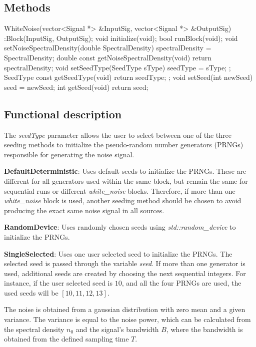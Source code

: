 \subsection*{Methods}

WhiteNoise(vector<Signal *> \&InputSig, vector<Signal *> \&OutputSig) :Block(InputSig, OutputSig){};
\bigbreak	
void initialize(void);
\bigbreak
bool runBlock(void);
\bigbreak
void setNoiseSpectralDensity(double SpectralDensity) { spectralDensity = SpectralDensity; }
\bigbreak
double const getNoiseSpectralDensity(void){ return spectralDensity; }
\bigbreak
void setSeedType(SeedType sType){ seedType = sType; };
\bigbreak
SeedType const getSeedType(void){ return seedType; };
\bigbreak
void setSeed(int newSeed) { seed = newSeed; }
\bigbreak
int getSeed(void){ return seed; }

\subsection*{Functional description}

The \textit{seedType} parameter allows the user to select between one of the three seeding methods to initialize the pseudo-random number generators (PRNGs) responsible for generating the noise signal.


\textbf{DefaultDeterministic}: Uses default seeds to initialize the PRNGs. These are different for all generators used within the same block, but remain the same for sequential runs or different \textit{white\_noise} blocks. Therefore, if more than one \textit{white\_noise} block is used, another seeding method should be chosen to avoid producing the exact same noise signal in all sources.

\textbf{RandomDevice}: Uses randomly chosen seeds using \textit{std::random\_device} to initialize the PRNGs.

\textbf{SingleSelected}: Uses one user selected seed to initialize the PRNGs. The selected seed is passed through the variable \textit{seed}. If more than one generator is used, additional seeds are created by choosing the next sequential integers. For instance, if the user selected seed is $10$, and all the four PRNGs are used, the used seeds will be $[10, 11, 12, 13]$.

The noise is obtained from a gaussian distribution with zero mean and a given variance. The variance is equal to the noise power, which can be calculated from the spectral density $n_0$ and the signal's bandwidth $B$, where the bandwidth is obtained from the defined sampling time $T$.

